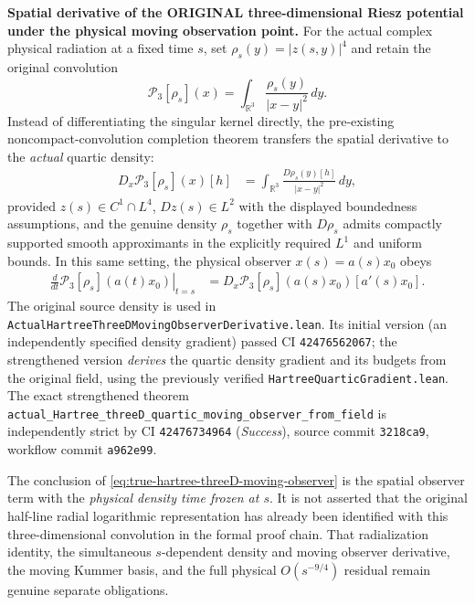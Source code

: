 \documentclass[11pt]{amsart}
\begin{document}
\medskip
\noindent\textbf{Spatial derivative of the ORIGINAL three-dimensional
Riesz potential under the physical moving observation point.}
For the actual complex physical radiation at a fixed time \(s\),
set \(\rho_s(y)=|z(s,y)|^4\) and retain the original convolution
\[
 \mathcal P_3[\rho_s](x)
 =\int_{\mathbb R^3}\frac{\rho_s(y)}{|x-y|^2}\,dy .
\]
Instead of differentiating the singular kernel directly, the
pre-existing noncompact-convolution completion theorem transfers
the spatial derivative to the \emph{actual} quartic density:
\begin{align}
 D_x\mathcal P_3[\rho_s](x)[h]
 &=\int_{\mathbb R^3}
    \frac{D\rho_s(y)[h]}{|x-y|^2}\,dy ,
 \label{eq:true-hartree-threeD-spatial-gradient}
\end{align}
provided \(z(s)\in C^1\cap L^4\), \(Dz(s)\in L^2\) with
the displayed boundedness assumptions, and the genuine density
\(\rho_s\) together with \(D\rho_s\) admits compactly supported
smooth approximants in the explicitly required \(L^1\) and
uniform bounds. In this same setting, the physical observer
\(x(s)=a(s)x_0\) obeys
\begin{align}
 \left.\frac{d}{dt}
   \mathcal P_3[\rho_s](a(t)x_0)\right|_{t=s}
 &=D_x\mathcal P_3[\rho_s](a(s)x_0)
   [a'(s)x_0].
 \label{eq:true-hartree-threeD-moving-observer}
\end{align}
The original source density is used in
\texttt{ActualHartreeThreeDMovingObserverDerivative.lean}.
Its initial version (an independently specified density gradient)
passed CI \texttt{42476562067}; the strengthened version
\emph{derives} the quartic density gradient and its budgets
from the original field, using the previously verified
\texttt{HartreeQuarticGradient.lean}.
The exact strengthened theorem
\texttt{actual\_Hartree\_threeD\_quartic\_moving\_observer\_from\_field}
is independently strict by CI \texttt{42476734964} (\emph{Success}),
source commit \texttt{3218ca9}, workflow commit \texttt{a962e99}.

The conclusion of \eqref{eq:true-hartree-threeD-moving-observer}
is the spatial observer term with the \emph{physical density time
frozen at \(s\)}. It is not asserted that the original half-line
radial logarithmic representation has already been identified with
this three-dimensional convolution in the formal proof chain.
That radialization identity, the simultaneous \(s\)-dependent
density and moving observer derivative, the moving Kummer basis,
and the full physical \(O(s^{-9/4})\) residual remain genuine
separate obligations.
\end{document}
